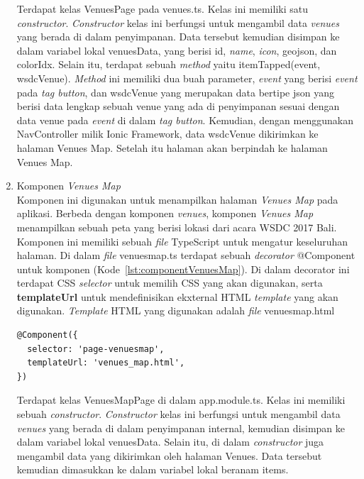 \begin{enumerate}
	Terdapat kelas VenuesPage pada venues.ts. Kelas ini memiliki satu \textit{constructor}. \textit{Constructor} kelas ini berfungsi untuk mengambil data \textit{venues} yang berada di dalam penyimpanan. Data tersebut kemudian disimpan ke dalam variabel lokal venuesData, yang berisi id, \textit{name}, \textit{icon}, geojson, dan colorIdx. 
	Selain itu, terdapat sebuah \textit{method} yaitu itemTapped(event, wsdcVenue). \textit{Method} ini memiliki dua buah parameter, \textit{event} yang berisi \textit{event} pada \textit{tag button}, dan wsdcVenue yang merupakan data bertipe json yang berisi data lengkap sebuah venue yang ada di penyimpanan sesuai dengan data venue pada \textit{event} di dalam \textit{tag button}. Kemudian, dengan menggunakan NavController milik Ionic Framework, data wsdcVenue dikirimkan ke halaman Venues Map. Setelah itu halaman akan berpindah ke halaman Venues Map.
	
	\item Komponen \textit{Venues Map} \\
	Komponen ini digunakan untuk menampilkan halaman \textit{Venues Map} pada aplikasi. Berbeda dengan komponen \textit{venues}, komponen \textit{Venues Map} menampilkan sebuah peta yang berisi lokasi dari acara WSDC 2017 Bali. Komponen ini memiliki sebuah \textit{file} TypeScript untuk mengatur keseluruhan halaman. Di dalam \textit{file} venues\textunderscore map.ts terdapat sebuah \textit{decorator} @Component untuk komponen (Kode~\ref{lst:componentVenuesMap}). Di dalam decorator ini terdapat CSS \textit{selector} untuk memilih CSS yang akan digunakan, serta \textbf{templateUrl} untuk mendefinisikan ekxternal HTML \textit{template} yang akan digunakan. \textit{Template} HTML yang digunakan adalah \textit{file} venues\textunderscore map.html
	
\begin{lstlisting}[label={lst:componentVenuesMap}, caption=@Component pada venues\textunderscore map.ts]
@Component({
  selector: 'page-venuesmap',
  templateUrl: 'venues_map.html',
})
\end{lstlisting}	

	Terdapat kelas VenuesMapPage di dalam app.module.ts. Kelas ini memiliki sebuah \textit{constructor}. \textit{Constructor} kelas ini berfungsi untuk mengambil data \textit{venues} yang berada di dalam penyimpanan internal, kemudian disimpan ke dalam variabel lokal venuesData. Selain itu, di dalam \textit{constructor} juga mengambil data yang dikirimkan oleh halaman Venues. Data tersebut kemudian dimasukkan ke dalam variabel lokal beranam items. 
	

\end{enumerate}
